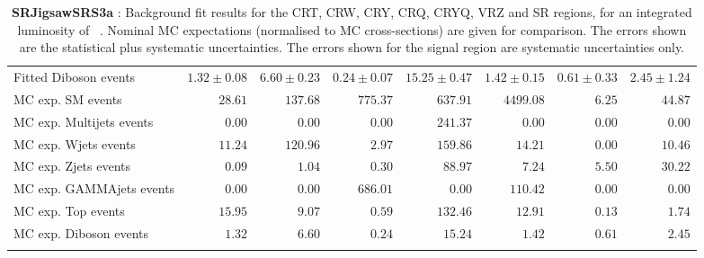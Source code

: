 \begin{table}
\begin{center}
{\begin{tabular*}{\textwidth}{@{\extracolsep{\fill}}lrrrrrrr}
        Fitted Diboson events         & $1.32 \pm 0.08$          & $6.60 \pm 0.23$          & $0.24 \pm 0.07$          & $15.25 \pm 0.47$          & $1.42 \pm 0.15$          & $0.61 \pm 0.33$          & $2.45 \pm 1.24$              \\
 \noalign{\smallskip}\hline\noalign{\smallskip}
MC exp. SM events              & $28.61$          & $137.68$          & $775.37$          & $637.91$          & $4499.08$          & $6.25$          & $44.87$              \\
\noalign{\smallskip}\hline\noalign{\smallskip}
        MC exp. Multijets events         & $0.00$          & $0.00$          & $0.00$          & $241.37$          & $0.00$          & $0.00$          & $0.00$              \\
        MC exp. Wjets events         & $11.24$          & $120.96$          & $2.97$          & $159.86$          & $14.21$          & $0.00$          & $10.46$              \\
        MC exp. Zjets events         & $0.09$          & $1.04$          & $0.30$          & $88.97$          & $7.24$          & $5.50$          & $30.22$              \\
        MC exp. GAMMAjets events         & $0.00$          & $0.00$          & $686.01$          & $0.00$          & $110.42$          & $0.00$          & $0.00$              \\
        MC exp. Top events         & $15.95$          & $9.07$          & $0.59$          & $132.46$          & $12.91$          & $0.13$          & $1.74$              \\
        MC exp. Diboson events         & $1.32$          & $6.60$          & $0.24$          & $15.24$          & $1.42$          & $0.61$          & $2.45$              \\
\noalign{\smallskip}\hline\noalign{\smallskip}
\end{tabular*}
}
\end{center}
\caption{{\bf SRJigsawSRS3a} : Background fit results for the CRT, CRW, CRY, CRQ, CRYQ, VRZ and SR regions, for an integrated luminosity of \ourintlumi~\ifb. Nominal MC expectations (normalised to MC cross-sections) are given for comparison. The errors shown are the statistical plus systematic uncertainties. The errors shown for the signal region are systematic uncertainties only.}
\label{table.results.systematics.in.logL.fit.CRT.CRW.CRY.CRQ.CRYQ.VRZ.SR.SRJigsawSRS3a}
\end{table}
%